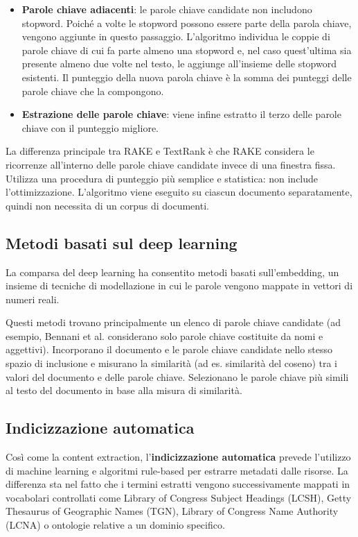 \begin{itemize}
\item \textbf{Parole chiave adiacenti}: le parole chiave candidate non includono stopword. Poiché a volte le stopword possono essere parte della parola chiave, vengono aggiunte in questo passaggio. L'algoritmo individua le coppie di parole chiave di cui fa parte almeno una stopword e, nel caso quest'ultima sia presente almeno due volte nel testo, le aggiunge all'insieme delle stopword esistenti. Il punteggio della nuova parola chiave è la somma dei punteggi delle parole chiave che la compongono.
\item \textbf{Estrazione delle parole chiave}: viene infine estratto il terzo delle parole chiave con il punteggio migliore.
\end{itemize}

La differenza principale tra RAKE e TextRank è che RAKE considera le ricorrenze all'interno delle parole chiave candidate invece di una finestra fissa. Utilizza una procedura di punteggio più semplice e statistica: non include l'ottimizzazione. L'algoritmo viene eseguito su ciascun documento separatamente, quindi non necessita di un corpus di documenti.

\subsection{Metodi basati sul deep learning}
La comparsa del deep learning ha consentito metodi basati sull'embedding, un insieme di tecniche di modellazione in cui le parole vengono mappate in vettori di numeri reali. 

Questi metodi trovano principalmente un elenco di parole chiave candidate (ad esempio, Bennani et al. considerano solo parole chiave costituite da nomi e aggettivi). Incorporano il documento e le parole chiave candidate nello stesso spazio di inclusione e misurano la similarità (ad es. similarità del coseno) tra i valori del documento e delle parole chiave. Selezionano le parole chiave più simili al testo del documento in base alla misura di similarità.

\subsection{Indicizzazione automatica}
Così come la content extraction, l'\textbf{indicizzazione automatica} prevede l'utilizzo di machine learning e algoritmi rule-based per estrarre metadati dalle risorse. La differenza sta nel fatto che i termini estratti vengono successivamente mappati in vocabolari controllati come Library of Congress Subject Headings (LCSH), Getty Thesaurus of Geographic Names (TGN), Library of Congress Name Authority (LCNA) o ontologie relative a un dominio specifico.


